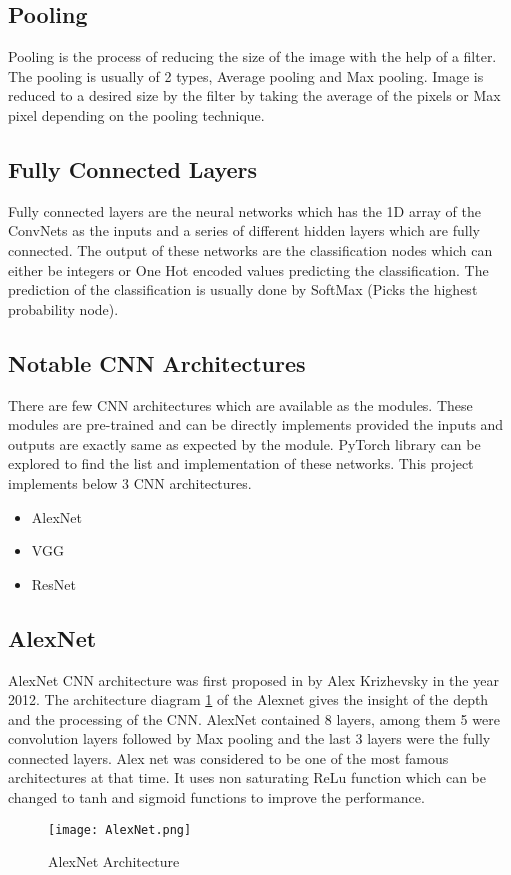 \subsection{Pooling}
Pooling is the process of reducing the size of the image with the help of a filter. The pooling is usually of 2 types, Average pooling and Max pooling. Image is reduced to a desired size by the filter by taking the average of the pixels or Max pixel depending on the pooling technique.
\subsection{Fully Connected Layers}
Fully connected layers are the neural networks which has the 1D array of the ConvNets as the inputs and a series of different hidden layers which are fully connected. The output of these networks are the classification nodes which can either be integers or One Hot encoded values predicting the classification. The prediction of the classification is usually done by SoftMax (Picks the highest probability node).
\subsection{Notable CNN Architectures}
There are few CNN architectures which are available as the modules. These modules are pre-trained and can be directly implements provided the inputs and outputs are exactly same as expected by the module. PyTorch library can be explored to find the list and implementation of these networks. This project implements below 3 CNN architectures.
\begin{itemize}
	\item AlexNet
	\item VGG
	\item ResNet
\end{itemize}
\subsection{AlexNet}
AlexNet CNN architecture was first proposed in \cite{krizhevsky2012imagenet} by Alex Krizhevsky in the year 2012. The architecture diagram \ref{fig:AlexNet} of the Alexnet gives the insight of the depth and the processing of the CNN. AlexNet contained 8 layers, among them 5 were convolution layers followed by Max pooling and the last 3 layers were the fully connected layers. Alex net was considered to be one of the most famous architectures at that time. It uses non saturating ReLu function which can be changed to tanh and sigmoid functions to improve the performance.
\begin{figure}[tb]
	\center\texttt{[image: AlexNet.png]}
	\caption{AlexNet Architecture \cite{article}}
	\label{fig:AlexNet}
\end{figure}

